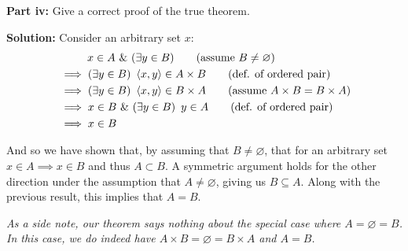 \documentclass{article}
\begin{document}
\noindent\textbf{Part iv:} Give a correct proof of the true theorem.
\bigskip

\noindent\textbf{Solution:} Consider an arbitrary set $x$:
\begin{align*}
    &\phantom{\implies\,\,\,}x\in A\,\,\&\,\,(\exists y\in B)\tag{assume $B\not=\varnothing$}\\
    &\implies(\exists y\in B)\,\,\,\langle x,y\rangle\in A\times B\tag{def. of ordered pair}\\
    &\implies(\exists y\in B)\,\,\,\langle x,y\rangle\in B\times A\tag{assume $A\times B=B\times A$}\\
    &\implies x\in B\,\,\&\,\,(\exists y\in B)\,\,\,y\in A\tag{def. of ordered pair}\\
    &\implies x\in B
\end{align*}

And so we have shown that, by assuming that $B\not=\varnothing$, that for an arbitrary set $x\in A\implies x\in B$ and thus $A\subset B$. A symmetric argument holds for the other direction under the assumption that $A\not=\varnothing$, giving us $B\subseteq A$. Along with the previous result, this implies that $A=B$.
\medskip

\textit{As a side note, our theorem says nothing about the special case where $A=\varnothing=B$. In this case, we do indeed have $A\times B=\varnothing=B\times A$ and $A=B$.}
\end{document}

